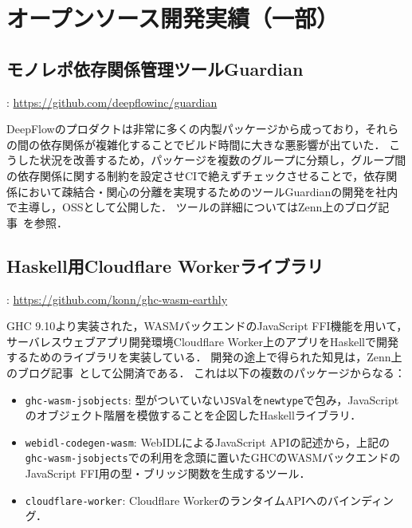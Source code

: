 \documentclass[a4j]{ltjsarticle}
\renewcommand{\emph}[1]{\textbf{\textgt{#1}}}
\begin{document}
\section*{オープンソース開発実績（一部）}
\begin{refsection}
\newrefcontext[labelprefix={OSS-}] 

\subsection*{モノレポ依存関係管理ツールGuardian}
\vspace{-1em}
\noindent
\emph{URL}: \url{https://github.com/deepflowinc/guardian}
\vspace{1em}

DeepFlowのプロダクトは非常に多くの内製パッケージから成っており，それらの間の依存関係が複雑化することでビルド時間に大きな悪影響が出ていた．
こうした状況を改善するため，パッケージを複数のグループに分類し，グループ間の依存関係に関する制約を設定させCIで絶えずチェックさせることで，依存関係において疎結合・関心の分離を実現するためのツールGuardianの開発を社内で主導し，OSSとして公開した．
ツールの詳細についてはZenn上のブログ記事~\cite{ISHII:2023gd}を参照．

\subsection*{Haskell用Cloudflare Workerライブラリ}
\vspace{-1em}
\noindent
\emph{URL}: \url{https://github.com/konn/ghc-wasm-earthly}
\vspace{1em}

GHC 9.10より実装された，WASMバックエンドのJavaScript FFI機能を用いて，サーバレスウェブアプリ開発環境Cloudflare Worker上のアプリをHaskellで開発するためのライブラリを実装している．
開発の途上で得られた知見は，Zenn上のブログ記事~\cite{ISHII:2024cf}として公開済である．
これは以下の複数のパッケージからなる：

\begin{itemize}
  \item \texttt{ghc-wasm-jsobjects}: 型がついていない\verb|JSVal|を\verb|newtype|で包み，JavaScriptのオブジェクト階層を模倣することを企図したHaskellライブラリ．
  \item \texttt{webidl-codegen-wasm}: WebIDLによるJavaScript APIの記述から，上記の\texttt{ghc-wasm-jsobjects}での利用を念頭に置いたGHCのWASMバックエンドのJavaScript FFI用の型・ブリッジ関数を生成するツール．
  \item \texttt{cloudflare-worker}: Cloudflare WorkerのランタイムAPIへのバインディング．
\end{itemize}


\end{refsection}
\end{document}
